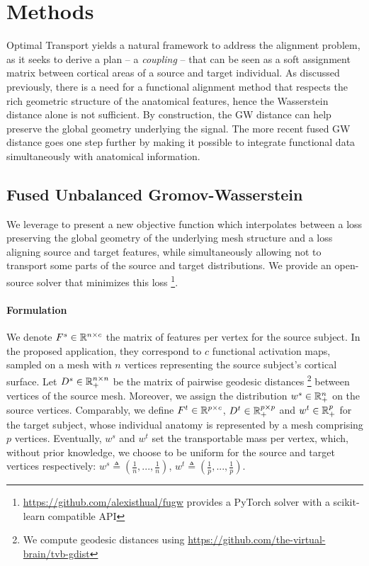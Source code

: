 \section{Methods}
\label{sec:methods}

Optimal Transport yields a natural framework to address the alignment problem,
as it seeks to derive a plan -- a \textit{coupling} -- that can be seen as a soft assignment matrix
between cortical areas of a source and target individual.
As discussed previously, there is a need for a functional alignment method that respects
the rich geometric structure of the anatomical features, hence the Wasserstein distance alone
is not sufficient.
By construction, the GW distance \citep{Memoli11,Memoli07}
can help preserve the global geometry underlying the signal.
The more recent fused GW distance \citep{Vayer19b} goes one step further by
making it possible to integrate functional data simultaneously with anatomical information.

\subsection{Fused Unbalanced Gromov-Wasserstein}

We leverage \citep{Vayer19b,Sejourne20} to present a new objective function which interpolates
between a loss preserving the global geometry of the underlying mesh structure and
a loss aligning source and target features, while simultaneously allowing not to transport
some parts of the source and target distributions. We provide an open-source solver
that minimizes this loss
\footnote{\href{https://github.com/alexisthual/fugw}{https://github.com/alexisthual/fugw}
provides a PyTorch \citep{NEURIPS2019_9015} solver with a scikit-learn \citep{scikit-learn}
compatible API}.

\paragraph{Formulation}
We denote $F^s \in \mathbb R^{n \times c}$ the matrix of features per vertex for the source subject.
In the proposed application, they correspond to $c$ functional activation maps,
sampled on a mesh with $n$ vertices representing the source subject's cortical surface.
Let $D^s \in \mathbb R^{n \times n}_+$ be the matrix of pairwise geodesic distances
\footnote{We compute geodesic distances using
\href{https://github.com/the-virtual-brain/tvb-gdist}{https://github.com/the-virtual-brain/tvb-gdist}}
between vertices of the source mesh.
Moreover, we assign the distribution $w^s \in \mathbb R^{n}_+$ on the source vertices.
Comparably, we define $F^t \in \mathbb R^{p \times c}$, $D^t \in \mathbb R^{p \times p}_+$ and
$w^t \in \mathbb R^{p}_+$ for the target subject, whose individual anatomy is represented
by a mesh comprising $p$ vertices.
Eventually, $w^s$ and $w^t$ set the transportable mass per vertex, which,
without prior knowledge, we choose to be uniform for the source and target vertices respectively:
$w^s \triangleq (\frac{1}{n}, ..., \frac{1}{n})$,
$w^t \triangleq (\frac{1}{p}, ..., \frac{1}{p})$.

